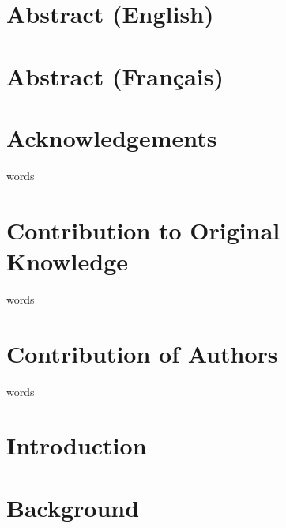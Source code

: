 \documentclass[fleqn,12pt]{SelfArx} %
\affiliation{\textit{Biological \& Biomedical Engineering, McGill University, Montréal, QC, Canada}}
\begin{document}
\flushbottom %
\makethesistitle %
\onecolumn
\tableofcontents %

\beginfront
\clearpage
{}
\section{Abstract (English)}
\clearpage

\section{Abstract (Français)}
\clearpage

\section{Acknowledgements}
words
\clearpage

\section{Contribution to Original Knowledge}
words
\clearpage

\section{Contribution of Authors}
words
\clearpage



\section{Introduction}


\section{Background}



\onecolumn
\clearpage
\end{document}
